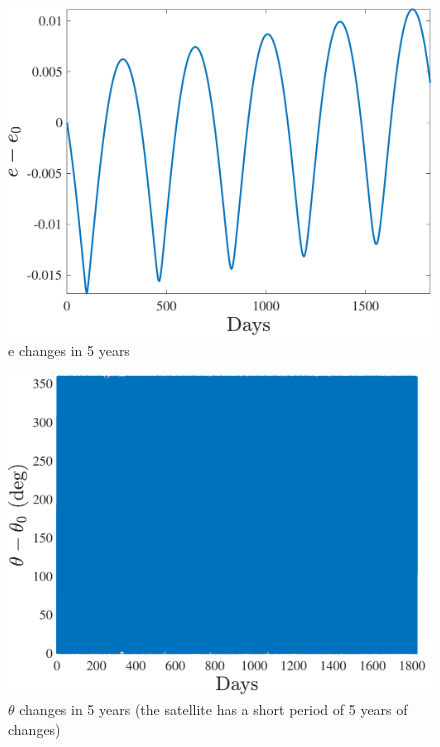\begin{figure}[H]
    \caption{e changes in 5 years}
    \centering
    \includegraphics[width=12cm]{../Figure/Q2/e_fig}
\end{figure}

\begin{figure}[H]
    \caption{$\theta$ changes in 5 years (the satellite has a short period of 5 years of changes)}
    \centering
    \includegraphics[width=12cm]{../Figure/Q2/theta_fig}
\end{figure}

